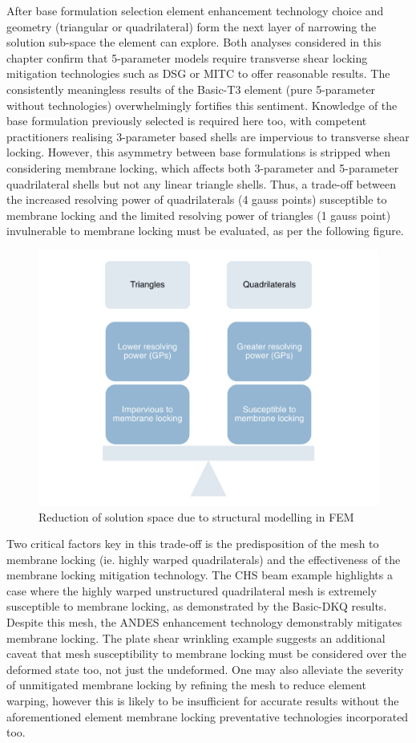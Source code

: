 After base formulation selection element enhancement technology choice and geometry (triangular or quadrilateral) form the next layer of narrowing the solution sub-space the element can explore. Both analyses considered in this chapter confirm that 5-parameter models require transverse shear locking mitigation technologies such as DSG or MITC to offer reasonable results. The consistently meaningless results of the Basic-T3 element (pure 5-parameter without technologies) overwhelmingly fortifies this sentiment. Knowledge of the base formulation previously selected is required here too, with competent practitioners realising 3-parameter based shells are impervious to transverse shear locking. However, this asymmetry between base formulations is stripped when considering membrane locking, which affects both 3-parameter and 5-parameter quadrilateral shells but not any linear triangle shells. Thus, a trade-off between the increased resolving power of quadrilaterals (4 gauss points) susceptible to membrane locking and the limited resolving power of triangles (1 gauss point) invulnerable to membrane locking must be evaluated, as per the following figure. 

\begin{figure}[H]
	\centering
	\def\svgwidth{\columnwidth}
	\includegraphics[width=12cm]{images/MODELLING_2.pdf}
	\caption{Reduction of solution space due to structural modelling in FEM}
	\label{pic:applications11}
\end{figure}

Two critical factors key in this trade-off is the predisposition of the mesh to membrane locking (ie. highly warped quadrilaterals) and the effectiveness of the membrane locking mitigation technology. The CHS beam example highlights a case where the highly warped unstructured quadrilateral mesh is extremely susceptible to membrane locking, as demonstrated by the Basic-DKQ results. Despite this mesh, the ANDES enhancement technology demonstrably mitigates membrane locking. The plate shear wrinkling example suggests an additional caveat that mesh susceptibility to membrane locking must be considered over the deformed state too, not just the undeformed. One may also alleviate the severity of unmitigated membrane locking by refining the mesh to reduce element warping, however this is likely to be insufficient for accurate results without the aforementioned element membrane locking preventative technologies incorporated too.

